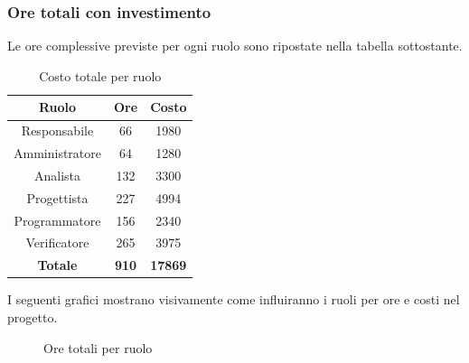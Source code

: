 \subsubsection{Ore totali con investimento}
Le ore complessive previste per ogni ruolo sono ripostate nella tabella sottostante.
\begin{table}[H]
	\centering
	\begin{tabular}{|c|c|c|}
		\hline
		\textbf{Ruolo} &
		\textbf{Ore} &
		\textbf{Costo} \\
		\hline
		Responsabile & 66 & 1980\\
		\hline
		Amministratore & 64 & 1280\\
		\hline
		Analista & 132 & 3300\\
		\hline
		Progettista & 227 & 4994 \\
		\hline
		Programmatore & 156 & 2340 \\
		\hline
		Verificatore & 265 & 3975\\
		\hline
		\textbf{Totale} & \textbf{910} & \textbf{17869} \\
		\hline
	\end{tabular}
	\caption{Costo totale per ruolo}
\end{table}
I seguenti grafici mostrano visivamente come influiranno i ruoli per ore e costi nel progetto.
\begin{figure}[H]
	\centering
	\caption{Ore totali per ruolo}
\end{figure}
